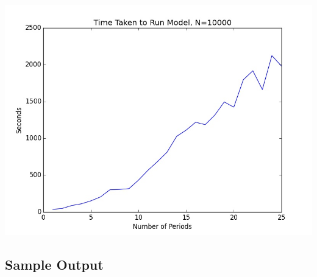 \documentclass[11pt,letterpaper]{article}
\begin{document}
 \\


		{
		\vspace{-1.5cm}
		\centering
		\includegraphics[width=\textwidth]{time_taken_keep.jpg} \\
		}

\subsection{Sample Output}


\end{document}
